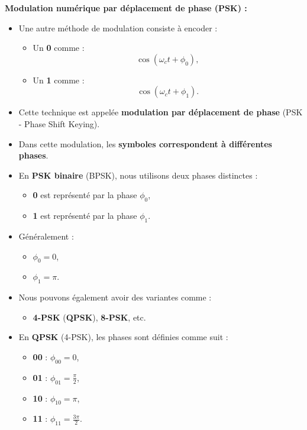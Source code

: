 \textbf{Modulation numérique par déplacement de phase (PSK) :}
\begin{itemize}
    \item Une autre méthode de modulation consiste à encoder :
    \begin{itemize}
        \item Un \textbf{0} comme :
        \[
        \cos(\omega_c t + \phi_0),
        \]
        \item Un \textbf{1} comme :
        \[
        \cos(\omega_c t + \phi_1).
        \]
    \end{itemize}
    \item Cette technique est appelée \textbf{modulation par déplacement de phase} (PSK - Phase Shift Keying).
    \item Dans cette modulation, les \textbf{symboles correspondent à différentes phases}.
    \item En \textbf{PSK binaire} (BPSK), nous utilisons deux phases distinctes :
    \begin{itemize}
        \item \textbf{0} est représenté par la phase $\phi_0$,
        \item \textbf{1} est représenté par la phase $\phi_1$.
    \end{itemize}
    \item Généralement :
    \begin{itemize}
        \item $\phi_0 = 0$,
        \item $\phi_1 = \pi$.
    \end{itemize}
    \item Nous pouvons également avoir des variantes comme :
    \begin{itemize}
        \item \textbf{4-PSK} (\textbf{QPSK}), \textbf{8-PSK}, etc.
    \end{itemize}
    \item En \textbf{QPSK} (4-PSK), les phases sont définies comme suit :
    \begin{itemize}
        \item \textbf{00} : $\phi_{00} = 0$,
        \item \textbf{01} : $\phi_{01} = \tfrac{\pi}{2}$,
        \item \textbf{10} : $\phi_{10} = \pi$,
        \item \textbf{11} : $\phi_{11} = \tfrac{3\pi}{2}$.
    \end{itemize}
\end{itemize}
